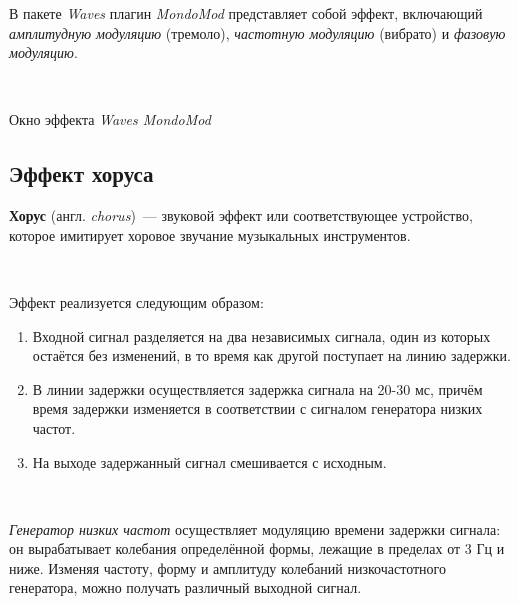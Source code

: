 \documentclass{beamer}
\begin{document}
\begin{frame}
  В пакете \emph{Waves} плагин \emph{MondoMod} представляет собой эффект, включающий \emph{амплитудную модуляцию} (тремоло), \emph{частотную модуляцию} (вибрато) и \emph{фазовую модуляцию}.

  ~

  \begin{block}{Окно эффекта \emph{Waves MondoMod}}
  \end{block}
\end{frame}

\subsection{Эффект хоруса}
\begin{frame}
  \textbf{Хорус} (англ. \textit{chorus})~--- звуковой эффект или соответствующее устройство, которое имитирует хоровое звучание музыкальных инструментов.

  ~

  Эффект реализуется следующим образом:
  \begin{enumerate}
    \item Входной сигнал разделяется на два независимых сигнала, один из которых остаётся без изменений, в то время как другой поступает на линию задержки.
    \item В линии задержки осуществляется задержка сигнала на 20-30 мс, причём время задержки изменяется в соответствии с сигналом генератора низких частот.
    \item На выходе задержанный сигнал смешивается с исходным.
  \end{enumerate}
  
  ~
  
  \emph{Генератор низких частот} осуществляет модуляцию времени задержки сигнала: он вырабатывает колебания определённой формы, лежащие в пределах от 3 Гц и ниже. Изменяя частоту, форму и амплитуду колебаний низкочастотного генератора, можно получать различный выходной сигнал.
\end{frame}
\end{document}
